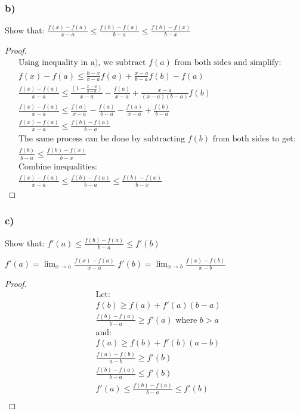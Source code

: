 \documentclass[12pt]{article}
\newenvironment{proposition}[2][Proposition]{\begin{trivlist}
\item[\hskip \labelsep {\bfseries #1}\hskip \labelsep {\bfseries #2.}]}{\end{trivlist}}
\begin{document}
\subsubsection*{b)}
Show that:
$\frac{f(x) - f(a)}{x-a} \le \frac{f(b) - f(a)}{b-a} \le \frac{f(b) - f(x)}{b-x}$

\begin{proof}
\begin{align*} 
& \text{Using inequality in a), we subtract $f(a)$ from both sides and simplify:}\\
& f(x) - f(a) \le \frac{b-x}{b-a}f(a) + \frac{x-a}{b-a}f(b) - f(a)\\
& \frac{f(x) - f(a)}{x-a} \le \frac{(1 - \frac{x-a}{b-a})}{x-a}-\frac{f(a)}{x-a} + \frac{x-a}{(x-a)(b-a)}f(b)\\
& \frac{f(x) - f(a)}{x-a} \le \frac{f(a)}{x-a} - \frac{f(a)}{b-a}-\frac{f(a)}{x-a} + \frac{f(b)}{b-a}\\
& \frac{f(x) - f(a)}{x-a} \le \frac{f(b)-f(a)}{b-a}\\
& \text{The same process can be done by subtracting $f(b)$ from both sides to get: }\\
& \frac{f(b)}{b-a} \le \frac{f(b)-f(x)}{b-x}\\
& \text{Combine inequalities: }\\
& \frac{f(x) - f(a)}{x-a} \le \frac{f(b) - f(a)}{b-a} \le \frac{f(b) - f(x)}{b-x}
\end{align*}
\end{proof}

\subsubsection*{c)}
Show that:
$ f'(a) \le \frac{f(b) - f(a)}{b-a} \le f'(b)$

\begin{proposition}{1}
$f'(a) = \lim_{x \to a} \frac{f(x)-f(a)}{x-a}$
$f'(b) = \lim_{x \to b} \frac{f(x)-f(b)}{x-b}$

\end{proposition}

\begin{proof}
\begin{align*} 
& \text{Let: }\\
& f(b) \ge f(a) + f'(a)(b-a)\\
& \frac{f(b) - f(a)}{b-a} \ge f'(a) \text{ where } b > a\\
& \text{and: }\\
& f(a) \ge f(b) + f'(b)(a-b)\\
& \frac{f(a) - f(b)}{a-b} \ge f'(b)\\
& \frac{f(b)-f(a)}{b-a} \le f'(b)\\
& f'(a) \le \frac{f(b) - f(a)}{b-a} \le f'(b)\\
\end{align*}
\end{proof}
\end{document}
